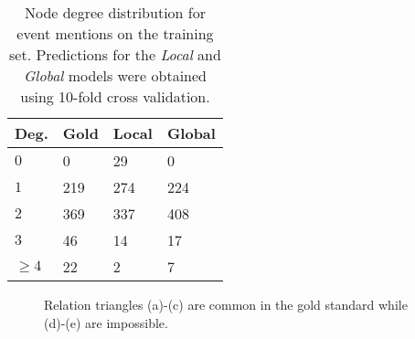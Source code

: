 \begin{table}[t]
{\small
\hfill{}
\begin{tabular}{ l | l | l | l }
\textbf{Deg.} &\textbf{Gold}&\textbf{Local} & \textbf{Global}\\
\hline
$0$            &     0        &    29       &   0 \\ 
$1$            &     219        &    274       & 224  \\ 
$2$            &     369        &    337       &  408  \\ 
$3$            &     46        &     14     &  17 \\ 
$\geq4$           &     22        &     2      &  7 
\end{tabular}}
\hfill{}
\caption{Node degree distribution for event mentions on the training set. Predictions for the \emph{Local} and \emph{Global} models were obtained using 10-fold cross validation.}
\label{tab:degree}
\end{table}

\begin{figure*}[ht]
  \begin{center}
      
  \end{center}
  \caption{Relation triangles (a)-(c) are common in the gold standard while (d)-(e) are impossible.}
  \label{fig:triad}
\end{figure*}






















